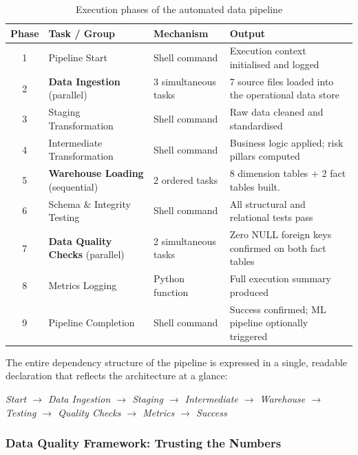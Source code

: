\begin{table}[H]
\centering
\small
\renewcommand{\arraystretch}{1.5}
\caption{Execution phases of the automated data pipeline}
\label{tab:dag_phases}
\begin{tabular}{|c|p{3.5cm}|p{4cm}|p{5cm}|}
\hline
\rowcolor{blue!15}
\textbf{Phase} & \textbf{Task / Group} & \textbf{Mechanism} & \textbf{Output} \\
\hline
1 & Pipeline Start & Shell command & Execution context initialised and logged \\
\hline
2 & \textbf{Data Ingestion} (parallel) & 3 simultaneous tasks & 7 source files loaded into the operational data store \\
\hline
3 & Staging Transformation & Shell command & Raw data cleaned and standardised \\
\hline
4 & Intermediate Transformation & Shell command & Business logic applied; risk pillars computed \\
\hline
5 & \textbf{Warehouse Loading} (sequential) & 2 ordered tasks & 8 dimension tables + 2 fact tables built.\\
\hline
6 & Schema \& Integrity Testing & Shell command & All structural and relational tests pass \\
\hline
7 & \textbf{Data Quality Checks} (parallel) & 2 simultaneous tasks & Zero NULL foreign keys confirmed on both fact tables \\
\hline
8 & Metrics Logging & Python function & Full execution summary produced \\
\hline
9 & Pipeline Completion & Shell command & Success confirmed; ML pipeline optionally triggered \\
\hline
\end{tabular}
\end{table}

The entire dependency structure of the pipeline is expressed in a single, readable
declaration that reflects the architecture at a glance:

\begin{center}
\small
\textit{Start $\rightarrow$ Data Ingestion $\rightarrow$ Staging $\rightarrow$ Intermediate $\rightarrow$ Warehouse $\rightarrow$ Testing $\rightarrow$ Quality Checks $\rightarrow$ Metrics $\rightarrow$ Success}
\end{center}

\subsubsection{Data Quality Framework: Trusting the Numbers}


